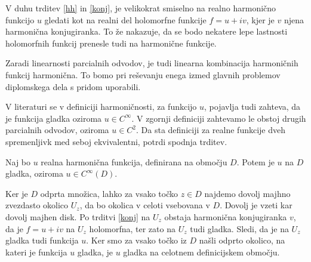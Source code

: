\documentclass[mat1]{fmfdelo}
\begin{document}
    \begin{opomba}
        V duhu trditev \ref{hh} in \ref{konj}, je velikokrat smiselno na realno harmonično funkcijo $u$ gledati kot na realni del holomorfne funkcije $f = u + iv$, kjer je $v$ njena harmonična konjugiranka. To že nakazuje, da se bodo nekatere lepe lastnosti holomorfnih funkcij prenesle tudi na harmonične funkcije.
    \end{opomba}
    \begin{opomba}
        \label{lin}
        Zaradi linearnosti parcialnih odvodov, je tudi linearna kombinacija harmoničnih funkcij harmonična. To bomo pri reševanju enega izmed glavnih problemov diplomskega dela s pridom uporabili.
    \end{opomba}
    \begin{opomba}
        V literaturi se v definiciji harmoničnosti, za funkcijo $u$, pojavlja tudi zahteva, da je funkcija gladka oziroma $u \in C^{\infty}$. V zgornji definiciji zahtevamo le obstoj drugih parcialnih odvodov, oziroma $u \in C^2$. 
        Da sta definiciji za realne funkcije dveh spremenljivk med seboj ekvivalentni, potrdi spodnja trditev. 
    \end{opomba}
    \begin{trditev}
        \label{gladkosth}
        Naj bo $u$ realna harmonična funkcija, definirana na območju $D$. Potem je $u$ na $D$ gladka, oziroma $u \in C^{\infty}(D)$. 
    \end{trditev}
    \begin{dokaz}
        Ker je  $D$ odprta množica, lahko za vsako točko $z \in D$ najdemo dovolj majhno zvezdasto okolico $U_z$, da bo okolica v celoti vsebovana v $D$. Dovolj je vzeti kar dovolj majhen disk. 
        Po trditvi \ref{konj} na $U_z$ obstaja harmonična konjugiranka $v$, da je $f = u+ iv$ na $U_z$ holomorfna, ter zato na $U_z$ tudi gladka. Sledi, da je na $U_z$ gladka tudi funkcija $u$.
        Ker smo za vsako točko iz $D$ našli odprto okolico, na kateri je funkcija $u$ gladka, je $u$ gladka na celotnem definicijskem območju.
    \end{dokaz}
\end{document}
